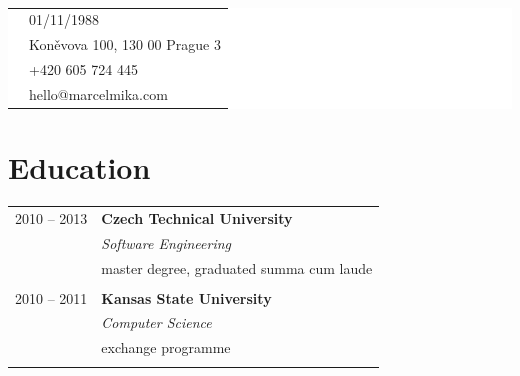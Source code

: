 \documentclass[10pt]{article} %
\begin{document}
\begin{minipage}[t]{0.5\textwidth}
\begin{minipage}[b]{0.30\textwidth}
\end{minipage}
\hspace{3pt}
\begin{minipage}{\textwidth} %
\raggedright
\mbox{}\\[-40pt]
\colorbox{white}{\textcolor{text1}{
\begin{tabular}{c|p{\textwidth}}
\raisebox{0pt}{\textborn} & 01/11/1988 \\ %
\raisebox{-1pt}{\textifsymbol{18}} & Koněvova 100, 130 00 Prague 3 \\ %
\raisebox{0pt}{\Telefon} & +420 605 724 445 \\ %
\raisebox{0pt}{\Letter} & hello@marcelmika.com \\ %
\end{tabular}
}}
\end{minipage}%


\hspace{5pt}
\section{Education} 
\medskip
\begin{tabular}{@{}rl@{}} 


\small\textsc{2010 -- 2013} & \large\textbf{Czech Technical University} \\ 
& \normalsize\textit{Software Engineering} \\ 
& \normalsize {master degree, graduated summa cum laude} \\ 
&\\


\small\textsc{2010 -- 2011} & \large\textbf{Kansas State University} \\ 
& \normalsize\textit{Computer Science} \\ 
& \normalsize {exchange programme} \\ 
&\\
	 

\end{tabular}
\end{minipage}
\end{document}
